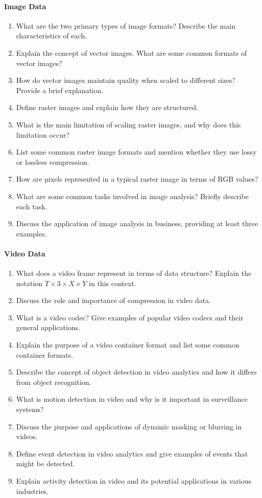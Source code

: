 \paragraph*{Image Data}
\begin{enumerate}
    \item What are the two primary types of image formats? Describe the main characteristics of each.
    \item Explain the concept of vector images. What are some common formats of vector images?
    \item How do vector images maintain quality when scaled to different sizes? Provide a brief explanation.
    \item Define raster images and explain how they are structured.
    \item What is the main limitation of scaling raster images, and why does this limitation occur?
    \item List some common raster image formats and mention whether they use lossy or lossless compression.
    \item How are pixels represented in a typical raster image in terms of RGB values? 
    \item What are some common tasks involved in image analysis? Briefly describe each task.
    \item Discuss the application of image analysis in business, providing at least three examples.
\end{enumerate}
\paragraph*{Video Data}
\begin{enumerate}
    \item What does a video frame represent in terms of data structure? Explain the notation \( T \times 3 \times X \times Y \) in this context.
    \item Discuss the role and importance of compression in video data. 
    \item What is a video codec? Give examples of popular video codecs and their general applications.
    \item Explain the purpose of a video container format and list some common container formats.
    \item Describe the concept of object detection in video analytics and how it differs from object recognition.
    \item What is motion detection in video and why is it important in surveillance systems?
    \item Discuss the purpose and applications of dynamic masking or blurring in videos.
    \item Define event detection in video analytics and give examples of events that might be detected.
    \item Explain activity detection in video and its potential applications in various industries.
\end{enumerate}
